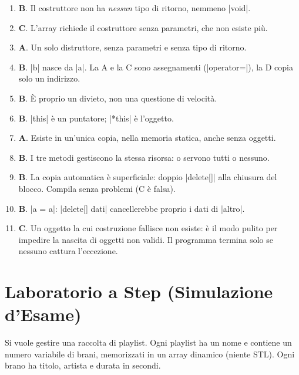 \begin{soluzione}
\begin{enumerate}[label=\textbf{\arabic*.}]
  \item \textbf{B}. Il costruttore non ha \emph{nessun} tipo di ritorno, nemmeno \cc|void|.
  \item \textbf{C}. L'array richiede il costruttore senza parametri, che non esiste più.
  \item \textbf{A}. Un solo distruttore, senza parametri e senza tipo di ritorno.
  \item \textbf{B}. \cc|b| nasce da \cc|a|. La A e la C sono assegnamenti
        (\cc|operator=|), la D copia solo un indirizzo.
  \item \textbf{B}. È proprio un divieto, non una questione di velocità.
  \item \textbf{B}. \cc|this| è un puntatore; \cc|*this| è l'oggetto.
  \item \textbf{A}. Esiste in un'unica copia, nella memoria statica, anche senza oggetti.
  \item \textbf{B}. I tre metodi gestiscono la stessa risorsa: o servono tutti o nessuno.
  \item \textbf{B}. La copia automatica è superficiale: doppio \cc|delete[]| alla
        chiusura del blocco. Compila senza problemi (C è falsa).
  \item \textbf{B}. \cc|a = a|: \cc|delete[] dati| cancellerebbe proprio i dati di \cc|altro|.
  \item \textbf{C}. Un oggetto la cui costruzione fallisce non esiste: è il modo pulito
        per impedire la nascita di oggetti non validi. Il programma termina solo se
        nessuno cattura l'eccezione.
\end{enumerate}
\end{soluzione}

\section{Laboratorio a Step (Simulazione d'Esame)}

\begin{traccia}
Si vuole gestire una raccolta di playlist. Ogni playlist ha un nome e contiene un
numero variabile di brani, memorizzati in un array dinamico (niente STL). Ogni brano
ha titolo, artista e durata in secondi.
\end{traccia}

